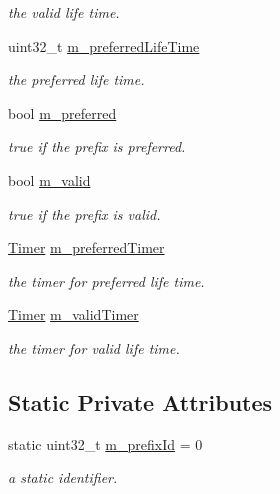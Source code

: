 \begin{DoxyCompactItemize}
\begin{DoxyCompactList}\small\item\em the valid life time. \end{DoxyCompactList}\item 
uint32\+\_\+t \hyperlink{classns3_1_1Ipv6AutoconfiguredPrefix_a4a1f65162a9458488684666ce873e512}{m\+\_\+preferred\+Life\+Time}
\begin{DoxyCompactList}\small\item\em the preferred life time. \end{DoxyCompactList}\item 
bool \hyperlink{classns3_1_1Ipv6AutoconfiguredPrefix_a805d0d90768052ce0e595086d8189ee0}{m\+\_\+preferred}
\begin{DoxyCompactList}\small\item\em true if the prefix is preferred. \end{DoxyCompactList}\item 
bool \hyperlink{classns3_1_1Ipv6AutoconfiguredPrefix_ab230819ea4f73287c3c6df3700bb0579}{m\+\_\+valid}
\begin{DoxyCompactList}\small\item\em true if the prefix is valid. \end{DoxyCompactList}\item 
\hyperlink{classns3_1_1Timer}{Timer} \hyperlink{classns3_1_1Ipv6AutoconfiguredPrefix_aae5e90506ba2dc7168bbf814634fca6a}{m\+\_\+preferred\+Timer}
\begin{DoxyCompactList}\small\item\em the timer for preferred life time. \end{DoxyCompactList}\item 
\hyperlink{classns3_1_1Timer}{Timer} \hyperlink{classns3_1_1Ipv6AutoconfiguredPrefix_aa28cf075b51ad6528bd8cf4be0f5d964}{m\+\_\+valid\+Timer}
\begin{DoxyCompactList}\small\item\em the timer for valid life time. \end{DoxyCompactList}\end{DoxyCompactItemize}
\subsection*{Static Private Attributes}
\begin{DoxyCompactItemize}
\item 
static uint32\+\_\+t \hyperlink{classns3_1_1Ipv6AutoconfiguredPrefix_a782d19dbdda32144f3a944c235cc86f0}{m\+\_\+prefix\+Id} = 0
\begin{DoxyCompactList}\small\item\em a static identifier. \end{DoxyCompactList}\end{DoxyCompactItemize}
